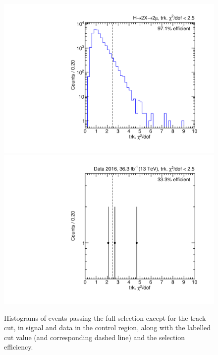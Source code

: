 \begin{figure}[p]
  \centering
  \includegraphics[width=\DSquareWidth]{figures/displaced/NM1_2Mu2J_trkChi2.pdf}
  \hspace*{-2em}
  \includegraphics[width=\DSquareWidth]{figures/displaced/NM1_Data_trkChi2.pdf}
  \caption[Histograms of events passing the full selection except for the track \normchisq cut in \twoMu signal and data.]{Histograms of events passing the full selection except for the track \normchisq cut, in  \twoMu signal and  data in the control region, along with the labelled cut value (and corresponding dashed line) and the selection efficiency.}
  \label{fig:dd:NM1_trkChi2}
\end{figure}

